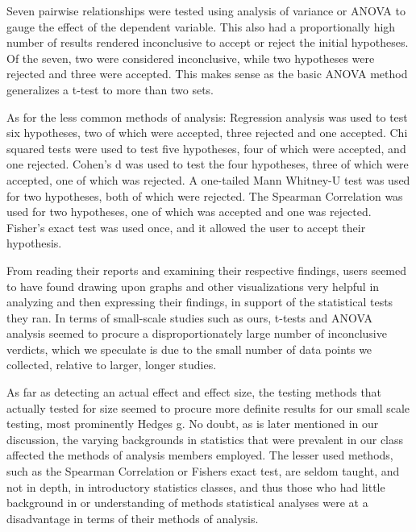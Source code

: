 Seven pairwise relationships were tested using analysis of variance or ANOVA to gauge the effect of the dependent variable. This also had a proportionally high number of results rendered inconclusive to accept or reject the initial hypotheses. Of the seven, two were considered inconclusive, while two hypotheses were rejected and three were accepted. This makes sense as the basic ANOVA method generalizes a t-test to more than two sets.

As for the less common methods of analysis:
Regression analysis was used to test six hypotheses, two of which were accepted, three rejected and one accepted. 
Chi squared tests were used to test five hypotheses, four of which were accepted, and one rejected.
Cohen’s d was used to test the four hypotheses, three of which were accepted, one of which was rejected. 
A one-tailed Mann Whitney-U test was used for two hypotheses, both of which were rejected.
The Spearman Correlation was used for two hypotheses, one of which was accepted and one was rejected. 
Fisher’s exact test was used once, and it allowed the user to accept their hypothesis. 

From reading their reports and examining their respective findings, users seemed to have found drawing upon graphs and other visualizations very helpful in analyzing and then expressing their findings, in support of the statistical tests they ran.  In terms of small-scale studies such as ours, t-tests and ANOVA analysis seemed to procure a disproportionately large number of inconclusive verdicts, which we speculate is due to the small number of data points we collected, relative to larger, longer studies.

As far as detecting an actual effect and effect size, the testing methods that actually tested for size seemed to procure more definite results for our small scale testing, most prominently Hedge\textquotesingle s g. No doubt, as is later mentioned in our discussion, the varying backgrounds in statistics that were prevalent in our class affected the methods of analysis members employed.  The lesser used methods, such as the Spearman Correlation or Fisher\textquotesingle s exact test, are seldom taught, and not in depth, in introductory statistics classes, and thus those who had little background in or understanding of methods statistical analyses were at a disadvantage in terms of their methods of analysis. 
